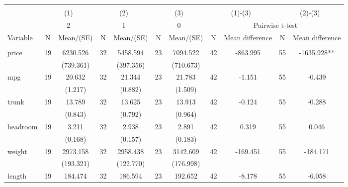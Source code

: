 
\begin{tabular}{@{\extracolsep{5pt}}lcccccccccc}
\\[-1.8ex]\hline \hline \\[-1.8ex]
 & \multicolumn{2}{c}{(1)}  & \multicolumn{2}{c}{(2)}  & \multicolumn{2}{c}{(3)}  & \multicolumn{2}{c}{(1)-(3)} & \multicolumn{2}{c}{(2)-(3)} \\
 & \multicolumn{2}{c}{2}  & \multicolumn{2}{c}{1}  & \multicolumn{2}{c}{0}  & \multicolumn{4}{c}{Pairwise t-test}  \\
Variable & N & Mean/(SE) & N & Mean/(SE) & N & Mean/(SE) & N & Mean difference & N & Mean difference \\ \hline \\[-1.8ex] 
price   & 19    & 6230.526    & 32    & 5458.594    & 23    & 7094.522    & 42    & -863.995    & 55    & -1635.928**   \\
 &   & (739.361)  &   & (397.356)  &   & (710.673)  &   &  &   &  \\ [1ex]
mpg   & 19    & 20.632    & 32    & 21.344    & 23    & 21.783    & 42    & -1.151    & 55    & -0.439   \\
 &   & (1.217)  &   & (0.882)  &   & (1.509)  &   &  &   &  \\ [1ex]
trunk   & 19    & 13.789    & 32    & 13.625    & 23    & 13.913    & 42    & -0.124    & 55    & -0.288   \\
 &   & (0.843)  &   & (0.792)  &   & (0.964)  &   &  &   &  \\ [1ex]
headroom   & 19    & 3.211    & 32    & 2.938    & 23    & 2.891    & 42    & 0.319    & 55    & 0.046   \\
 &   & (0.168)  &   & (0.157)  &   & (0.183)  &   &  &   &  \\ [1ex]
weight   & 19    & 2973.158    & 32    & 2958.438    & 23    & 3142.609    & 42    & -169.451    & 55    & -184.171   \\
 &   & (193.321)  &   & (122.770)  &   & (176.998)  &   &  &   &  \\ [1ex]
length   & 19    & 184.474    & 32    & 186.594    & 23    & 192.652    & 42    & -8.178    & 55    & -6.058   \\

\end{tabular}
